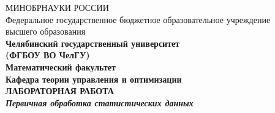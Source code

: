 \documentclass[12pt,a4paper,titlepage]{article}
\begin{document}
\begin{titlepage}
\begin{center}
  МИНОБРНАУКИ РОССИИ\\
  Федеральное государственное бюджетное образовательное учреждение\\ высшего образования\\

\bfseries \flqq Челябинский государственный университет\frqq \\
\bfseries (ФГБОУ ВО \flqq ЧелГУ\frqq) \\[0.7cm]

Математический факультет\\
Кафедра теории управления и оптимизации\\[3.4cm]
\large\bfseries ЛАБОРАТОРНАЯ РАБОТА\\[1cm]
\textit{\large\bfseries{Первичная обработка статистических данных\\[2cm]}}


\end{center}
\end{titlepage}
\end{document}
